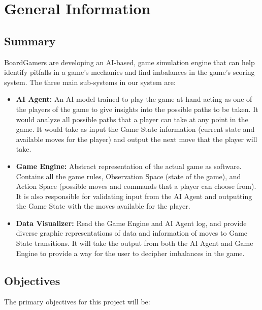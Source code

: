\documentclass[12pt, titlepage]{article}
\begin{document}
\section{General Information}

\subsection{Summary}
BoardGamers are developing an AI-based, game simulation engine that can help identify pitfalls in a game's mechanics and find imbalances in the game's scoring system. The three main sub-systems in our system are:
\begin{itemize}
    \item \textbf{AI Agent:} An AI model trained to play the game at hand acting as one of the players of the game to give insights into the possible paths to be taken. It would analyze all possible paths that a player can take at any point in the game. It would take as input the Game State information (current state and available moves for the player) and output the next move that the player will take. 
    
    \item \textbf{Game Engine:} Abstract representation of the actual game as software. Contains all the game rules, Observation Space (state of the game), and Action Space (possible moves and commands that a player can choose from). It is also responsible for validating input from the AI Agent and outputting the Game State with the moves available for the player. 
    
    \item \textbf{Data Visualizer:} Read the Game Engine and AI Agent log, and provide diverse graphic representations of data and information of moves to Game State transitions. It will take the output from both the AI Agent and Game Engine to provide a way for the user to decipher imbalances in the game.

\end{itemize}

\subsection{Objectives}

The primary objectives for this project will be:
\end{document}

